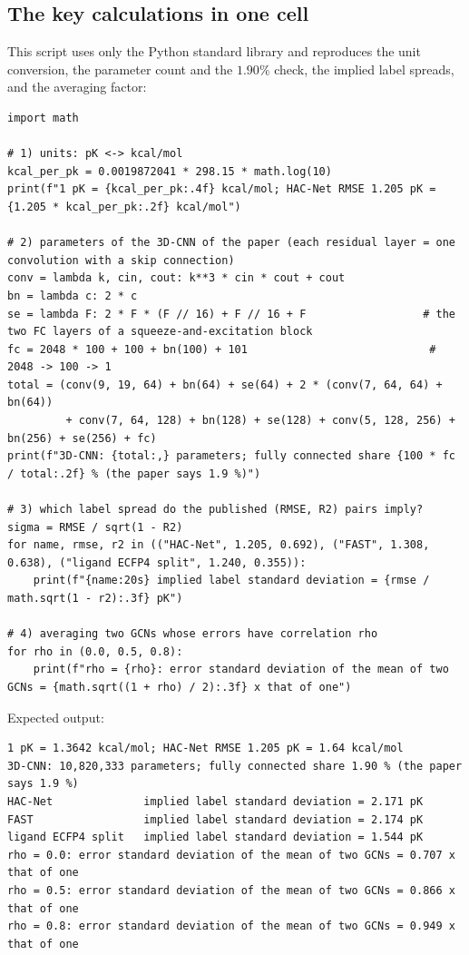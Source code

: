 \documentclass[11pt]{article}
\begin{document}
\subsection{The key calculations in one cell}
This script uses only the Python standard library and reproduces the unit conversion, the parameter count and the $1.90\%$ check, the implied label spreads, and the averaging factor:

\begin{lstlisting}
import math

# 1) units: pK <-> kcal/mol
kcal_per_pk = 0.0019872041 * 298.15 * math.log(10)
print(f"1 pK = {kcal_per_pk:.4f} kcal/mol; HAC-Net RMSE 1.205 pK = {1.205 * kcal_per_pk:.2f} kcal/mol")

# 2) parameters of the 3D-CNN of the paper (each residual layer = one convolution with a skip connection)
conv = lambda k, cin, cout: k**3 * cin * cout + cout
bn = lambda c: 2 * c
se = lambda F: 2 * F * (F // 16) + F // 16 + F                  # the two FC layers of a squeeze-and-excitation block
fc = 2048 * 100 + 100 + bn(100) + 101                            # 2048 -> 100 -> 1
total = (conv(9, 19, 64) + bn(64) + se(64) + 2 * (conv(7, 64, 64) + bn(64))
         + conv(7, 64, 128) + bn(128) + se(128) + conv(5, 128, 256) + bn(256) + se(256) + fc)
print(f"3D-CNN: {total:,} parameters; fully connected share {100 * fc / total:.2f} % (the paper says 1.9 %)")

# 3) which label spread do the published (RMSE, R2) pairs imply?  sigma = RMSE / sqrt(1 - R2)
for name, rmse, r2 in (("HAC-Net", 1.205, 0.692), ("FAST", 1.308, 0.638), ("ligand ECFP4 split", 1.240, 0.355)):
    print(f"{name:20s} implied label standard deviation = {rmse / math.sqrt(1 - r2):.3f} pK")

# 4) averaging two GCNs whose errors have correlation rho
for rho in (0.0, 0.5, 0.8):
    print(f"rho = {rho}: error standard deviation of the mean of two GCNs = {math.sqrt((1 + rho) / 2):.3f} x that of one")
\end{lstlisting}

Expected output:
\begin{lstlisting}[language={},basicstyle=\ttfamily\small]
1 pK = 1.3642 kcal/mol; HAC-Net RMSE 1.205 pK = 1.64 kcal/mol
3D-CNN: 10,820,333 parameters; fully connected share 1.90 % (the paper says 1.9 %)
HAC-Net              implied label standard deviation = 2.171 pK
FAST                 implied label standard deviation = 2.174 pK
ligand ECFP4 split   implied label standard deviation = 1.544 pK
rho = 0.0: error standard deviation of the mean of two GCNs = 0.707 x that of one
rho = 0.5: error standard deviation of the mean of two GCNs = 0.866 x that of one
rho = 0.8: error standard deviation of the mean of two GCNs = 0.949 x that of one
\end{lstlisting}
\end{document}
